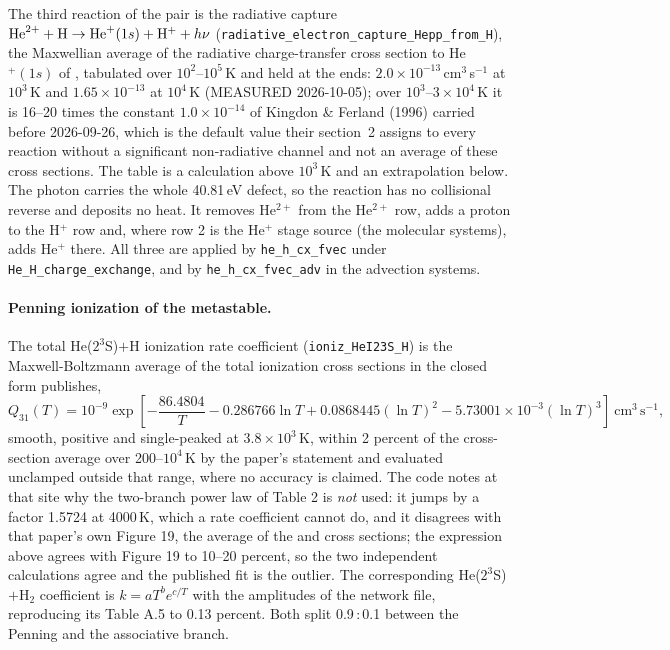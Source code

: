 The third reaction of the pair is the radiative capture
${\rm He}^{2+} + {\rm H} \to {\rm He}^+(1s) + {\rm H}^+ + h\nu$
(\texttt{radiative\_electron\_capture\_Hepp\_from\_H}), the Maxwellian average
of the radiative charge-transfer cross section to He$^+(1s)$ of
\citet[Figs.~4--6, digitized, resolved resonances included; the paper gives
no rate coefficient]{West1982},
tabulated over $10^2$--$10^5$\,K and held at the ends:
$2.0\times10^{-13}$\,cm$^3$\,s$^{-1}$ at $10^3$\,K and $1.65\times10^{-13}$ at
$10^4$\,K (MEASURED 2026-10-05); over $10^3$--$3\times10^4$\,K it is 16--20
times the constant $1.0\times10^{-14}$ of Kingdon \& Ferland (1996) carried
before 2026-09-26, which is the default value their section~2 assigns to every
reaction without a significant non-radiative channel and not an average of
these cross sections.
The table is a calculation above $10^3$\,K and an extrapolation below. The
photon carries the whole 40.81\,eV defect, so the reaction has no
collisional reverse and deposits no heat. It removes He$^{2+}$ from the He$^{2+}$
row, adds a proton to the H$^+$ row and, where row 2 is the He$^+$ stage
source (the molecular systems), adds He$^+$ there. All three are applied by
\texttt{he\_h\_cx\_fvec} under \texttt{He\_H\_charge\_exchange}, and by
\texttt{he\_h\_cx\_fvec\_adv} in the advection systems.

\paragraph{Penning ionization of the metastable.} The total
He($2^3$S)$+$H ionization rate coefficient (\texttt{ioniz\_HeI23S\_H}) is the
Maxwell-Boltzmann average of the \citet[Fig.~10]{Movre1997} total ionization cross
sections in the closed form \citet[Fig.~5 and network rows 198--199]{GarciaMunoz2025}
publishes,
\begin{equation}
Q_{31}(T) = 10^{-9}\exp\!\left[-\frac{86.4804}{T}
   - 0.286766\ln T + 0.0868445\left(\ln T\right)^{2}
   - 5.73001\times10^{-3}\left(\ln T\right)^{3}\right]\ \mathrm{cm^{3}\,s^{-1}},
\label{eq:ion:penning}
\end{equation}
smooth, positive and single-peaked at $3.8\times10^{3}$\,K, within 2 percent
of the cross-section average over 200--$10^4$\,K by the paper's statement and
evaluated unclamped outside that range, where no accuracy is claimed. The
code notes at that site why the two-branch power law of \citet{Taylor2025}
Table 2 is \emph{not} used: it jumps by a factor 1.5724 at 4000\,K, which a
rate coefficient cannot do, and it disagrees with that paper's own Figure 19,
the average of the \citet{Cohen1971} and \citet{Morgner1979} cross sections;
the expression above agrees with Figure 19 to 10--20 percent, so the two
independent calculations agree and the published fit is the outlier.
The corresponding He($2^3$S)$+$H$_2$ coefficient is
$k = aT^{b}e^{c/T}$ with the \citet{Cohen1977} amplitudes of the
\citet{GarciaMunoz2025} network file, reproducing its Table A.5 to 0.13
percent. Both split 0.9\,:\,0.1 between the Penning and the associative
branch.

